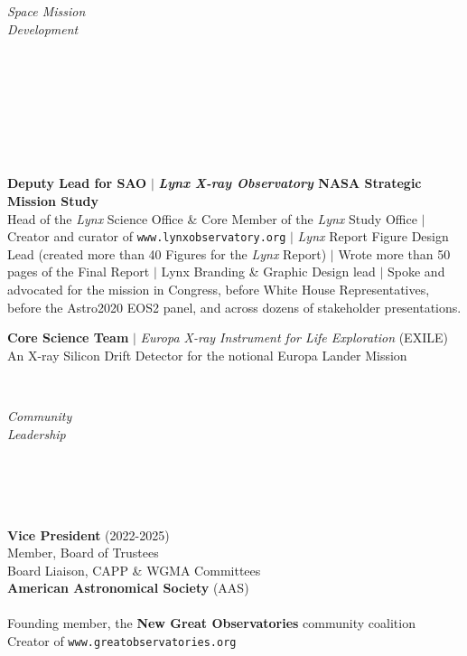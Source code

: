 \documentclass[11pt]{article}
\begin{document}
\vspace{3mm}

\hspace{2.5mm} \parbox{1.5in}{\textit{Space Mission \\ Development\\\\\\\\\\\\\\\\} } \parbox{5.15in}{
\textbf{Deputy Lead for SAO} $|$ \textbf{\textit{Lynx X-ray Observatory} NASA Strategic Mission Study} \\
Head of the \textit{Lynx} Science Office \& Core Member of the \textit{Lynx} Study Office
$|$ Creator and curator of \texttt{www.lynxobservatory.org} $|$
\textit{Lynx} Report Figure Design Lead (created more than 40 Figures for the \textit{Lynx} Report)
$|$ Wrote more than 50 pages of the Final Report $|$ Lynx Branding \& Graphic Design lead $|$ Spoke and advocated for the mission in Congress, before White House Representatives, before the Astro2020 EOS2 panel, and across dozens of stakeholder presentations.


\vspace{3mm}
\textbf{Core Science Team} $|$ \textit{Europa X-ray Instrument for Life Exploration} (EXILE)\\
An X-ray Silicon Drift Detector for the notional Europa Lander Mission} \\




\vspace{3mm}

\hspace{2.5mm} \parbox{1.5in}{\textit{Community \\ Leadership}\\\\\\\\\\} \parbox{5.15in}{\textbf{Vice President} (2022-2025) \\ Member, Board of Trustees \\ Board Liaison, CAPP \& WGMA Committees  \\ \textbf{American Astronomical Society} (AAS) \\\\ Founding member, the \textbf{New Great Observatories} community coalition\\ Creator of \texttt{www.greatobservatories.org}
}
\end{document}
